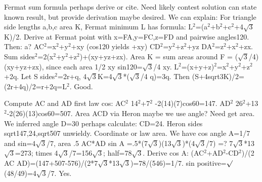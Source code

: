 \begin{decodedreasoningpanel}
Fermat sum formula perhaps derive or cite. Need likely contest solution can state known result, but provide derivation maybe desired. We can explain:
For triangle side lengths a,b,c area K, Fermat minimum L has formula:
L\ensuremath{^2}=(a\ensuremath{^2}+b\ensuremath{^2}+c\ensuremath{^2}+4\ensuremath{\sqrt{3}}K)/2.
Derive at Fermat point with x=FA,y=FC,z=FD and pairwise angles120. Then:
a? AC\ensuremath{^2}=x\ensuremath{^2}+y\ensuremath{^2}+xy (cos120 yields +xy)
CD\ensuremath{^2}=y\ensuremath{^2}+z\ensuremath{^2}+yz
DA\ensuremath{^2}=z\ensuremath{^2}+x\ensuremath{^2}+zx.
Sum sides\ensuremath{^2}=2(x\ensuremath{^2}+y\ensuremath{^2}+z\ensuremath{^2})+(xy+yz+zx).
Area K = sum areas around F = (\ensuremath{\sqrt{3}}/4)(xy+yz+zx), since each area 1/2 xy sin120=\ensuremath{\sqrt{3}}/4 xy.
L\ensuremath{^2}=(x+y+z)\ensuremath{^2}=x\ensuremath{^2}+y\ensuremath{^2}+z\ensuremath{^2}+2q.
Let S sides\ensuremath{^2}=2r+q, 4\ensuremath{\sqrt{3}}K=4\ensuremath{\sqrt{3}}*(\ensuremath{\sqrt{3}}/4 q)=3q. Then (S+4sqrt3K)/2=(2r+4q)/2=r+2q=L\ensuremath{^2}. Good.

Compute AC
  and AD first law cos:
AC\ensuremath{^2} 14\ensuremath{^2}+7\ensuremath{^2} -2(14)(7)cos60=147.
AD\ensuremath{^2} 26\ensuremath{^2}+13\ensuremath{^2}-2(26)(13)cos60=507.
Area ACD via Heron maybe we use angle? Need get area. We inferred angle D=30 perhaps calculate:
CD=24. Heron sides sqrt147,24,sqrt507 unwieldy. Coordinate or law area. We have cos angle A=1/7 and sin=4\ensuremath{\sqrt{3}}/7, area .5 AC*AD sin A =.5*(7\ensuremath{\sqrt{3}})(13\ensuremath{\sqrt{3}})*(4\ensuremath{\sqrt{3}}/7) =? 7\ensuremath{\sqrt{3}}*13\ensuremath{\sqrt{3}}=273; times 4\ensuremath{\sqrt{3}}/7=156\ensuremath{\sqrt{3}}; half=78\ensuremath{\sqrt{3}}. Derive cos A:
(AC\ensuremath{^2}+AD\ensuremath{^2}-CD\ensuremath{^2})/(2 AC AD)=(147+507-576)/(2*7\ensuremath{\sqrt{3}}*13\ensuremath{\sqrt{3}})=78/(546)=1/7.
sin positive=\ensuremath{\surd}(48/49)=4\ensuremath{\sqrt{3}}/7.
Yes.


\end{decodedreasoningpanel}
